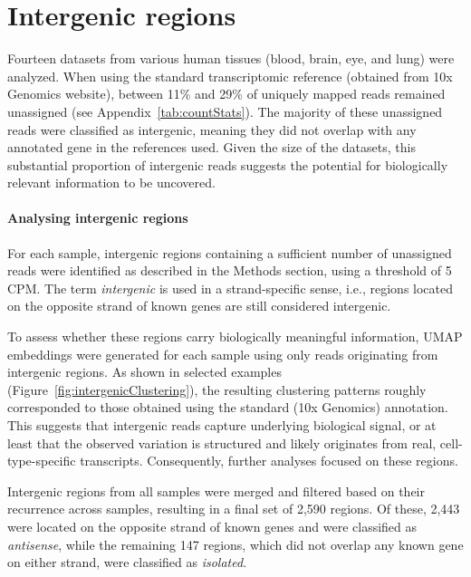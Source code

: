 \section{Intergenic regions}

Fourteen datasets from various human tissues (blood, brain, eye, and lung) were analyzed.
When using the standard transcriptomic reference (obtained from 10x Genomics website), between 11\% and 29\%
of uniquely mapped reads remained unassigned (see Appendix~\ref{tab:countStats}).
The majority of these unassigned reads were classified as intergenic,
meaning they did not overlap with any annotated gene in the references used.
Given the size of the datasets, this substantial proportion of intergenic reads suggests the potential
for biologically relevant information to be uncovered.

\paragraph{Analysing intergenic regions}

For each sample, intergenic regions containing a sufficient number of unassigned reads
were identified as described in the Methods section, using a threshold of 5 CPM.
The term \textit{intergenic} is used in a strand-specific sense,
i.e., regions located on the opposite strand of known genes are still considered intergenic.

To assess whether these regions carry biologically meaningful information,
UMAP embeddings were generated for each sample using only reads originating from intergenic regions.
As shown in selected examples (Figure~\ref{fig:intergenicClustering}), the resulting clustering patterns
roughly corresponded to those obtained using the standard (10x Genomics) annotation.
This suggests that intergenic reads capture underlying biological signal, or at least
that the observed variation is structured and likely originates from real, cell-type-specific transcripts.
Consequently, further analyses focused on these regions.

Intergenic regions from all samples were merged and filtered based on their recurrence across samples,
resulting in a final set of 2,590 regions.
Of these, 2,443 were located on the opposite strand of known genes and were classified as \textit{antisense},
while the remaining 147 regions,
which did not overlap any known gene on either strand, were classified as \textit{isolated}.

